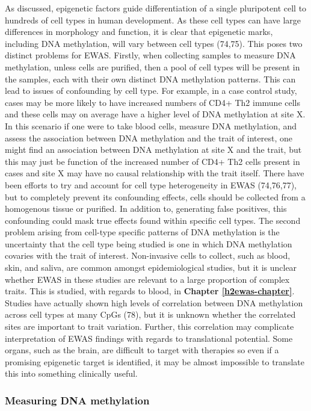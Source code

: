 \documentclass[11pt,oneside]{bristolthesis}
\begin{document}
As discussed, epigenetic factors guide differentiation of a single pluripotent cell to hundreds of cell types in human development. As these cell types can have large differences in morphology and function, it is clear that epigenetic marks, including DNA methylation, will vary between cell types (74,75). This poses two distinct problems for EWAS. Firstly, when collecting samples to measure DNA methylation, unless cells are purified, then a pool of cell types will be present in the samples, each with their own distinct DNA methylation patterns. This can lead to issues of confounding by cell type. For example, in a case control study, cases may be more likely to have increased numbers of CD4+ Th2 immune cells and these cells may on average have a higher level of DNA methylation at site X. In this scenario if one were to take blood cells, measure DNA methylation, and assess the association between DNA methylation and the trait of interest, one might find an association between DNA methylation at site X and the trait, but this may just be function of the increased number of CD4+ Th2 cells present in cases and site X may have no causal relationship with the trait itself. There have been efforts to try and account for cell type heterogeneity in EWAS (74,76,77), but to completely prevent its confounding effects, cells should be collected from a homogenous tissue or purified. In addition to, generating false positives, this confounding could mask true effects found within specific cell types. The second problem arising from cell-type specific patterns of DNA methylation is the uncertainty that the cell type being studied is one in which DNA methylation covaries with the trait of interest. Non-invasive cells to collect, such as blood, skin, and saliva, are common amongst epidemiological studies, but it is unclear whether EWAS in these studies are relevant to a large proportion of complex traits. This is studied, with regards to blood, in \textbf{Chapter \ref{h2ewas-chapter}}. Studies have actually shown high levels of correlation between DNA methylation across cell types at many CpGs (78), but it is unknown whether the correlated sites are important to trait variation. Further, this correlation may complicate interpretation of EWAS findings with regards to translational potential. Some organs, such as the brain, are difficult to target with therapies so even if a promising epigenetic target is identified, it may be almost impossible to translate this into something clinically useful.

\hypertarget{measuring-dna-methylation}{%
\subsubsection{Measuring DNA methylation}\label{measuring-dna-methylation}}
\end{document}
